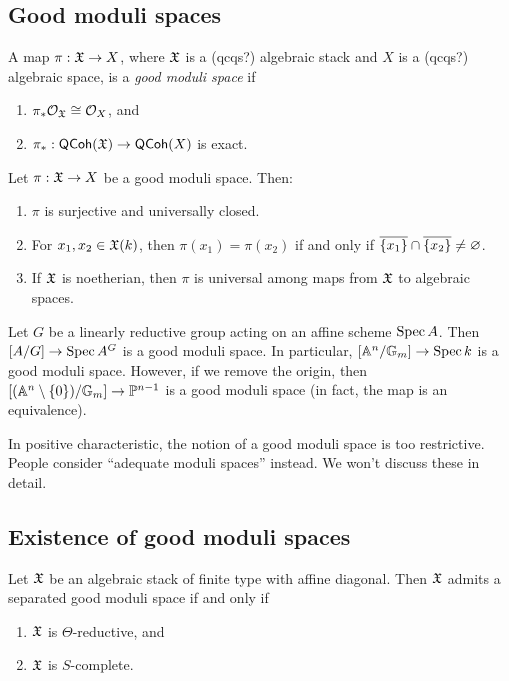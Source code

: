 \documentclass{amsart}
\begin{document}
\subsection{Good moduli spaces}

\begin{dfn}
	A map $\pi: \mathfrak{X} \to X$, where $\mathfrak{X}$ is a (qcqs?) algebraic stack and $X$ is a (qcqs?) algebraic space, is a \emph{good moduli space} if
	\begin{enumerate}
		\item $\pi_* \mathcal{O}_{\mathfrak{X}} \cong \mathcal{O}_X$, and
		\item $\pi_*: \mathsf{QCoh}(\mathfrak{X}) \to \mathsf{QCoh}(X)$ is exact.
	\end{enumerate}
\end{dfn}

\begin{thm}
	Let $\pi: \mathfrak{X} \to X$ be a good moduli space.
	Then:
	\begin{enumerate}
		\item $\pi$ is surjective and universally closed.
		\item For $x_1, x_2 \in \mathfrak{X}(k)$, then $\pi(x_1) = \pi(x_2)$ if and only if $\overline{\{x_1\}} \cap \overline{\{x_2\}} \neq \varnothing$.
		\item If $\mathfrak{X}$ is noetherian, then $\pi$ is universal among maps from $\mathfrak{X}$ to algebraic spaces.
	\end{enumerate}
\end{thm}

\begin{ex}
	Let $G$ be a linearly reductive group acting on an affine scheme $\operatorname{Spec} A$.
	Then $[A / G] \to \operatorname{Spec} A^G$ is a good moduli space.
	In particular, $[\mathbb{A}^n / \mathbb{G}_m] \to \operatorname{Spec} k$ is a good moduli space.
	However, if we remove the origin, then $[(\mathbb{A}^n \setminus \{0\}) / \mathbb{G}_m] \to \mathbb{P}^{n-1}$ is a good moduli space (in fact, the map is an equivalence).
\end{ex}

In positive characteristic, the notion of a good moduli space is too restrictive.
People consider ``adequate moduli spaces'' instead.
We won't discuss these in detail.

\subsection{Existence of good moduli spaces}

\begin{thm}
	Let $\mathfrak{X}$ be an algebraic stack of finite type with affine diagonal.
	Then $\mathfrak{X}$ admits a separated good moduli space if and only if
	\begin{enumerate}
		\item $\mathfrak{X}$ is $\Theta$-reductive, and 
		\item $\mathfrak{X}$ is $S$-complete.
	\end{enumerate}
\end{thm}
\end{document}
